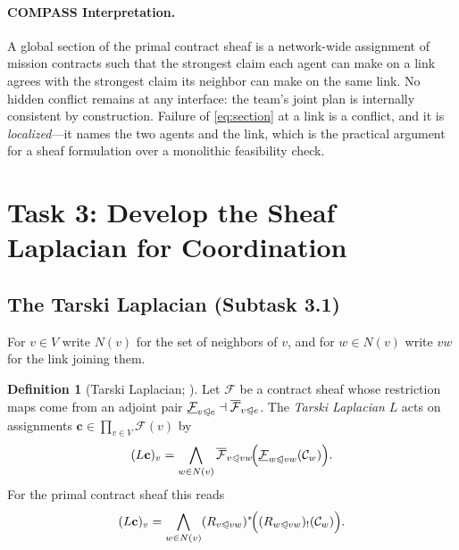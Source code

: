 \documentclass[11pt]{article}
\newif\ifshowcomments
\newcommand{\face}{\trianglelefteqslant}
\theoremstyle{definition}
\newtheorem{definition}{Definition}
\theoremstyle{remark}
\newcommand{\prompt}[1]{%
    \ifshowcomments
        ~\todo[inline, color=techgold!80, textcolor=black,caption={Task}]{{\bf Prompt:} #1}%
    \fi
}
\begin{document}
\paragraph{COMPASS Interpretation.}
A global section of the primal contract sheaf is a network-wide assignment of mission contracts
such that the strongest claim each agent can make on a link agrees with the strongest claim its
neighbor can make on the same link.
No hidden conflict remains at any interface: the team's joint plan is internally consistent by
construction.
Failure of \eqref{eq:section} at a link is a conflict, and it is \emph{localized}---it names the
two agents and the link, which is the practical argument for a sheaf formulation over a
monolithic feasibility check.

\section{Task 3: Develop the Sheaf Laplacian for Coordination}
\label{sec:task3}

\prompt{This task develops a sheaf Laplacian to iteratively update task assignments via local
communications, converging to consistent global assignments. It includes mathematical
formulation, convergence proof, and initial coding.}

\subsection{The Tarski Laplacian (Subtask 3.1)}
\label{sec:laplacian}

\prompt{Formulate the sheaf Laplacian using adjoints and weighted limits, enabling agents to
aggregate neighbor data for task coordination. Deliverable: Laplacian formulation, part of
Milestone 3's report.}

For $v \in V$ write $N(v)$ for the set of neighbors of $v$, and for $w \in N(v)$ write $vw$
for the link joining them.

\begin{definition}[Tarski Laplacian; \citealp{Ghrist_2022}]
\label{def:tarski-laplacian}
Let $\mathcal{F}$ be a contract sheaf whose restriction maps come from an adjoint pair
$\underline{\mathcal{F}}_{v \face e} \dashv \overline{\mathcal{F}}_{v \face e}$.
The \emph{Tarski Laplacian} $L$ acts on assignments
$\mathbf{c} \in \prod_{v \in V} \mathcal{F}(v)$ by
\begin{equation}
\label{eq:tarski}
(L\mathbf{c})_v
  = \bigwedge_{w \in N(v)}
    \overline{\mathcal{F}}_{v \face vw}\!\Bigl(
      \underline{\mathcal{F}}_{w \face vw}(\mathcal{C}_w)
    \Bigr).
\end{equation}
For the primal contract sheaf this reads
\begin{equation}
\label{eq:contract-laplacian}
(L\mathbf{c})_v
  = \bigwedge_{w \in N(v)}
    (R_{v \face vw})^{*}\!\Bigl( (R_{w \face vw})_!(\mathcal{C}_w) \Bigr).
\end{equation}
\end{definition}
\end{document}
